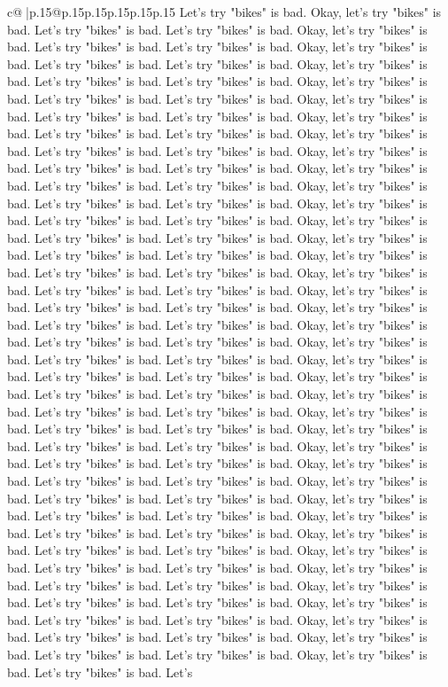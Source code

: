 \documentclass{article}
\begin{document}
{\begin{supertabular}{c@{$\;$}|p{.15\linewidth}@{}p{.15\linewidth}p{.15\linewidth}p{.15\linewidth}p{.15\linewidth}p{.15\linewidth}}
{{{Let's try "bikes" is bad. Okay, let's try "bikes" is bad. Let's try "bikes" is bad. Let's try "bikes" is bad. Okay, let's try "bikes" is bad. Let's try "bikes" is bad. Let's try "bikes" is bad. Okay, let's try "bikes" is bad. Let's try "bikes" is bad. Let's try "bikes" is bad. Okay, let's try "bikes" is bad. Let's try "bikes" is bad. Let's try "bikes" is bad. Okay, let's try "bikes" is bad. Let's try "bikes" is bad. Let's try "bikes" is bad. Okay, let's try "bikes" is bad. Let's try "bikes" is bad. Let's try "bikes" is bad. Okay, let's try "bikes" is bad. Let's try "bikes" is bad. Let's try "bikes" is bad. Okay, let's try "bikes" is bad. Let's try "bikes" is bad. Let's try "bikes" is bad. Okay, let's try "bikes" is bad. Let's try "bikes" is bad. Let's try "bikes" is bad. Okay, let's try "bikes" is bad. Let's try "bikes" is bad. Let's try "bikes" is bad. Okay, let's try "bikes" is bad. Let's try "bikes" is bad. Let's try "bikes" is bad. Okay, let's try "bikes" is bad. Let's try "bikes" is bad. Let's try "bikes" is bad. Okay, let's try "bikes" is bad. Let's try "bikes" is bad. Let's try "bikes" is bad. Okay, let's try "bikes" is bad. Let's try "bikes" is bad. Let's try "bikes" is bad. Okay, let's try "bikes" is bad. Let's try "bikes" is bad. Let's try "bikes" is bad. Okay, let's try "bikes" is bad. Let's try "bikes" is bad. Let's try "bikes" is bad. Okay, let's try "bikes" is bad. Let's try "bikes" is bad. Let's try "bikes" is bad. Okay, let's try "bikes" is bad. Let's try "bikes" is bad. Let's try "bikes" is bad. Okay, let's try "bikes" is bad. Let's try "bikes" is bad. Let's try "bikes" is bad. Okay, let's try "bikes" is bad. Let's try "bikes" is bad. Let's try "bikes" is bad. Okay, let's try "bikes" is bad. Let's try "bikes" is bad. Let's try "bikes" is bad. Okay, let's try "bikes" is bad. Let's try "bikes" is bad. Let's try "bikes" is bad. Okay, let's try "bikes" is bad. Let's try "bikes" is bad. Let's try "bikes" is bad. Okay, let's try "bikes" is bad. Let's try "bikes" is bad. Let's try "bikes" is bad. Okay, let's try "bikes" is bad. Let's try "bikes" is bad. Let's try "bikes" is bad. Okay, let's try "bikes" is bad. Let's try "bikes" is bad. Let's try "bikes" is bad. Okay, let's try "bikes" is bad. Let's try "bikes" is bad. Let's try "bikes" is bad. Okay, let's try "bikes" is bad. Let's try "bikes" is bad. Let's try "bikes" is bad. Okay, let's try "bikes" is bad. Let's try "bikes" is bad. Let's try "bikes" is bad. Okay, let's try "bikes" is bad. Let's try "bikes" is bad. Let's try "bikes" is bad. Okay, let's try "bikes" is bad. Let's try "bikes" is bad. Let's try "bikes" is bad. Okay, let's try "bikes" is bad. Let's try "bikes" is bad. Let's try "bikes" is bad. Okay, let's try "bikes" is bad. Let's try "bikes" is bad. Let's try "bikes" is bad. Okay, let's try "bikes" is bad. Let's try "bikes" is bad. Let's try "bikes" is bad. Okay, let's try "bikes" is bad. Let's try "bikes" is bad. Let's try "bikes" is bad. Okay, let's try "bikes" is bad. Let's try "bikes" is bad. Let's try "bikes" is bad. Okay, let's try "bikes" is bad. Let's try "bikes" is bad. Let's try "bikes" is bad. Okay, let's try "bikes" is bad. Let's try "bikes" is bad. Let's }}}
\end{supertabular}}
\end{document}
